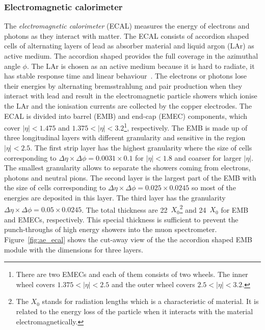 
\subsubsection{Electromagnetic calorimeter}
\label{subsubsec:ae_ecal}
The \textit{electromagnetic calorimeter} (ECAL) measures the energy of electrons and photons as they interact with matter.
The ECAL consists of accordion shaped cells of alternating layers of lead as absorber material and liquid argon (LAr) as active medium.
The accordion shaped provides the full coverage in the azimuthal angle $\phi$.
The LAr is chosen as an active medium because it is hard to radiate, it has stable response time and linear behaviour~\cite{Aad:2008zzm}.
The electrons or photons lose their energies by alternating bremsstrahlung and pair production when they interact with lead and result in the electromagnetic particle showers which ionise the LAr and the ionisation currents are collected by the copper electrodes.
The ECAL is divided into barrel (EMB) and end-cap (EMEC) components, which cover $|\eta| < 1.475$ and $1.375 < |\eta| < 3.2$\footnote{There are two EMECs and each of them consists of two wheels. The inner wheel covers $1.375 < |\eta| < 2.5$ and the outer wheel covers $2.5 < |\eta| < 3.2$.}, respectively.
The EMB is made up of three longitudinal layers with different granularity and sensitive in the region $|\eta| < 2.5$.
The first strip layer has the highest granularity where the size of cells corresponding to $\Delta \eta \times \Delta \phi = 0.0031 \times 0.1$ for $|\eta| < 1.8$ and coarser for larger $|\eta|$.
The smallest granularity allows to separate the showers coming from electrons, photons and neutral pions.
The second layer is the largest part of the EMB with the size of cells corresponding to $\Delta \eta \times \Delta \phi = 0.025 \times 0.0245$ so most of the energies are deposited in this layer.
The third layer has the granularity $\Delta \eta \times \Delta \phi = 0.05 \times 0.0245$.
The total thickness are 22~$X_{0}$\footnote{The $X_{0}$ stands for radiation lengths which is a characteristic of material. It is related to the energy loss of the particle when it interacts with the material electromagnetically.} and 24~$X_{0}$ for EMB and EMECs, respectively.
This special thickness is sufficient to prevent the punch-throughs of high energy showers into the muon spectrometer.
Figure~\ref{fig:ae_ecal} shows the cut-away view of the the accordion shaped EMB module with the dimensions for three layers.

